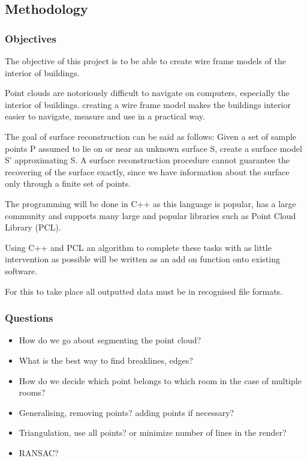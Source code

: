 \subsection{Methodology}

\subsubsection{Objectives}

The objective of this project is to be able to create wire frame models of the interior of buildings.

Point clouds are notoriously difficult to navigate on computers, especially the interior of buildings. creating a wire frame model makes the buildings interior easier to navigate, measure and use in a practical way.

The goal of surface reconstruction can be said as follows: Given a set of sample points P assumed to lie on or near an unknown surface S, create a surface model S' approximating S.
A surface reconstruction procedure cannot guarantee the recovering of the surface exactly, since we have information about the surface only through a finite set of points.

The programming will be done in C++ as this language is popular, has a large community and supports many large and popular libraries such as Point Cloud Library (PCL). 

Using C++ and PCL an algorithm to complete these tasks with as little intervention as possible will be written as an add on function onto existing software.

For this to take place all outputted data must be in recognised file formats.


\subsubsection{Questions}
\begin{itemize}

\item How do we go about segmenting the point cloud?

\item What is the best way to find breaklines, edges?

\item How do we decide which point belongs to which room in the case of multiple rooms?

\item Generalising, removing points? adding points if necessary?

\item Triangulation, use all points? or minimize number of lines in the render?

\item RANSAC?

\end{itemize}


